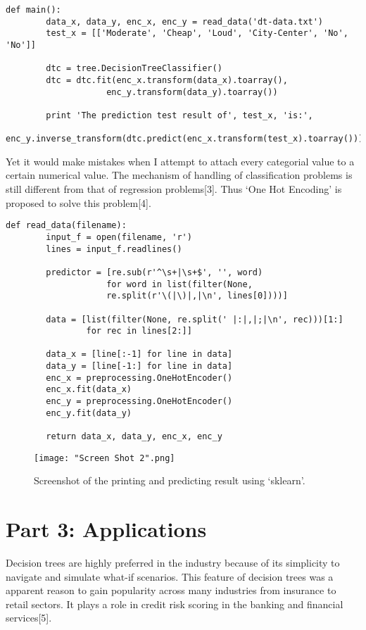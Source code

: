 \documentclass[12pt,letterpaper]{article}
\begin{document}
\begin{lstlisting}[style=python]
    def main():
        data_x, data_y, enc_x, enc_y = read_data('dt-data.txt')
        test_x = [['Moderate', 'Cheap', 'Loud', 'City-Center', 'No', 'No']]

        dtc = tree.DecisionTreeClassifier()
        dtc = dtc.fit(enc_x.transform(data_x).toarray(),
                    enc_y.transform(data_y).toarray())

        print 'The prediction test result of', test_x, 'is:', 
        enc_y.inverse_transform(dtc.predict(enc_x.transform(test_x).toarray()))
\end{lstlisting}


Yet it would make mistakes when I attempt to attach every categorial value to a certain numerical value. The mechanism of handling of classification problems is still different from that of regression problems[3]. Thus `One Hot Encoding' is proposed to solve this problem[4]. 

\begin{lstlisting}[style=python]
    def read_data(filename):
        input_f = open(filename, 'r')
        lines = input_f.readlines()

        predictor = [re.sub(r'^\s+|\s+$', '', word)
                    for word in list(filter(None, 
                    re.split(r'\(|\)|,|\n', lines[0])))]

        data = [list(filter(None, re.split(' |:|,|;|\n', rec)))[1:]
                for rec in lines[2:]]

        data_x = [line[:-1] for line in data]
        data_y = [line[-1:] for line in data]
        enc_x = preprocessing.OneHotEncoder()
        enc_x.fit(data_x)
        enc_y = preprocessing.OneHotEncoder()
        enc_y.fit(data_y)

        return data_x, data_y, enc_x, enc_y
\end{lstlisting}

\begin{figure}[!b]
    \label{pic:result2}
    \centering
    \texttt{[image: "Screen Shot 2".png]}
    \caption{Screenshot of the printing and predicting result using `sklearn'.}
\end{figure}

\section*{Part 3: Applications}
Decision trees are highly preferred in the industry because of its simplicity to navigate and simulate what-if scenarios. This feature of decision trees was a apparent reason to gain popularity across many industries from insurance to retail sectors.
 It plays a role in credit risk scoring in the banking and financial services[5].
\end{document}
